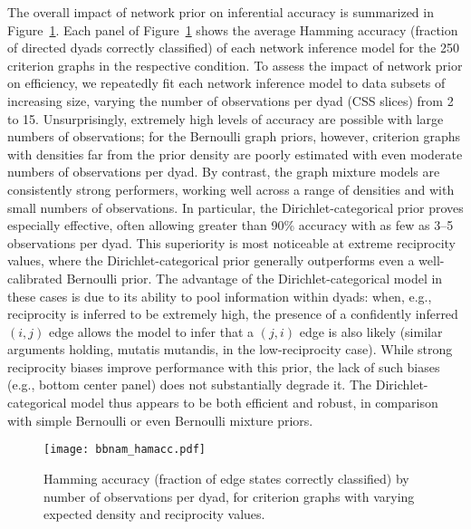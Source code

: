 \documentclass[11pt]{article}
\begin{document}
The overall impact of network prior on inferential accuracy is summarized in Figure~\ref{f_hamacc}.  Each panel of Figure~\ref{f_hamacc} shows the average Hamming accuracy (fraction of directed dyads correctly classified) of each network inference model for the 250 criterion graphs in the respective condition.  To assess the impact of network prior on efficiency, we repeatedly fit each network inference model to data subsets of increasing size, varying the number of observations per dyad (CSS slices) from 2 to 15.  Unsurprisingly, extremely high levels of accuracy are possible with large numbers of observations; for the Bernoulli graph priors, however, criterion graphs with densities far from the prior density are poorly estimated with even moderate numbers of observations per dyad.  By contrast, the graph mixture models are consistently strong performers, working well across a range of densities and with small numbers of observations.  In particular, the Dirichlet-categorical prior proves especially effective, often allowing greater than 90\% accuracy with as few as 3--5 observations per dyad.  This superiority is most noticeable at extreme reciprocity values, where the Dirichlet-categorical prior generally outperforms even a well-calibrated Bernoulli prior.  The advantage of the Dirichlet-categorical model in these cases is due to its ability to pool information within dyads: when, e.g., reciprocity is inferred to be extremely high, the presence of a confidently inferred $(i,j)$ edge allows the model to infer that a $(j,i)$ edge is also likely (similar arguments holding, mutatis mutandis, in the low-reciprocity case).  While strong reciprocity biases improve performance with this prior, the lack of such biases (e.g., bottom center panel) does not substantially degrade it.  The Dirichlet-categorical model thus appears to be both efficient and robust, in comparison with simple Bernoulli or even Bernoulli mixture priors.

\begin{figure}
\begin{center}
\texttt{[image: bbnam\_hamacc.pdf]}
\caption{\label{f_hamacc} Hamming accuracy (fraction of edge states correctly classified) by number of observations per dyad, for criterion graphs with varying expected density and reciprocity values.}
\end{center}
\end{figure}
\end{document}

